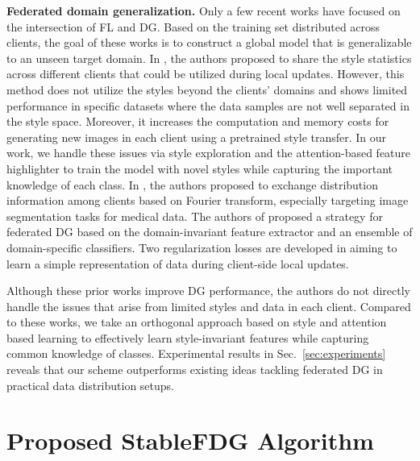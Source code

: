 \documentclass{article}
\theoremstyle{plain}
\theoremstyle{definition}
\theoremstyle{remark}
\begin{document}
 
\textbf{Federated domain generalization.} Only a few recent works   \cite{liu2021feddg, chen2023federated, wu2021collaborative, nguyen2022fedsr}  have focused on the intersection of FL and DG.   
 Based on the training set distributed across  clients, the goal of these works  is to construct a  global model that is generalizable to an   unseen target domain.  In \cite{chen2023federated}, the  authors proposed to share the   style statistics  across different clients that could be utilized during  local updates.    However,  this method does not utilize the  styles beyond the clients' domains and   shows limited performance in specific datasets where the data samples are not well separated in the style space. Moreover, it increases the computation and memory costs for generating new images in each client using a pretrained style transfer. In our work, we handle these issues via style exploration and the attention-based feature highlighter to train the model with novel styles while capturing  the  important knowledge of each class.  In \cite{liu2021feddg}, the authors proposed to exchange  distribution information among clients based on Fourier transform,  especially targeting image segmentation tasks for medical data.  The authors of \cite{wu2021collaborative} proposed a strategy for federated DG based on the domain-invariant feature extractor and an ensemble of domain-specific classifiers. Two regularization losses  are developed in \cite{nguyen2022fedsr}   aiming to learn a simple representation of   data during client-side local updates.   
 
 
 Although  these prior works \cite{liu2021feddg,   wu2021collaborative, nguyen2022fedsr} improve DG performance, the authors  do not directly handle the issues that arise from limited styles and data in each client. Compared to these works, we take an orthogonal approach based on  style  and attention based learning  to effectively learn style-invariant features while capturing common knowledge of classes. Experimental results in Sec.~\ref{sec:experiments} reveals that our scheme outperforms existing ideas tackling federated DG in practical data distribution setups.  
  
 \vspace{-1mm}

\section{Proposed StableFDG Algorithm}
\vspace{-1mm}
\end{document}
